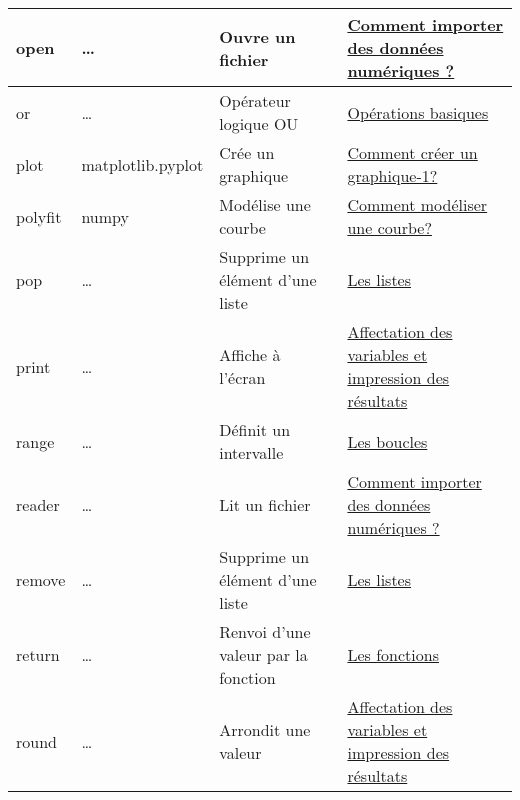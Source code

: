 \begin{longtable}{@{\extracolsep{\fill}}|p{} | p{} |p{} | p{}|@{}}
open
 & 
\ldots{}
 & 
Ouvre un fichier
 & 
\href{https://pyspc.readthedocs.io/fr/latest/05-bases/09-fichiers-csv.html}{Comment
importer des données numériques ?}
\\ \hline

or
 & 
\ldots{}
 & 
Opérateur logique OU
 & 
\href{https://pyspc.readthedocs.io/fr/latest/05-bases/04-operations_basiques.html}{Opérations
basiques}
\\ \hline

plot
 & 
matplotlib.pyplot
 & 
Crée un graphique
 & 
\href{https://pyspc.readthedocs.io/fr/latest/05-bases/10-graphiques_partie_1.html}{Comment
créer un graphique-1?}
\\ \hline

polyfit
 & 
numpy
 & 
Modélise une courbe
 & 
\href{https://pyspc.readthedocs.io/fr/latest/05-bases/11-modelisation.html}{Comment
modéliser une courbe?}
\\ \hline

pop
 & 
\ldots{}
 & 
Supprime un élément d'une liste
 & 
\href{https://pyspc.readthedocs.io/fr/latest/05-bases/08-listes.html}{Les
listes}
\\ \hline

print
 & 
\ldots{}
 & 
Affiche à l'écran
 & 
\href{https://pyspc.readthedocs.io/fr/latest/05-bases/02-variables_input_print.html}{Affectation
des variables et impression des résultats}
\\ \hline

range
 & 
\ldots{}
 & 
Définit un intervalle
 & 
\href{https://pyspc.readthedocs.io/fr/latest/05-bases/06-boucles.html}{Les
boucles}
\\ \hline

reader
 & 
\ldots{}
 & 
Lit un fichier
 & 
\href{https://pyspc.readthedocs.io/fr/latest/05-bases/09-fichiers-csv.html}{Comment
importer des données numériques ?}
\\ \hline

remove
 & 
\ldots{}
 & 
Supprime un élément d'une liste
 & 
\href{https://pyspc.readthedocs.io/fr/latest/05-bases/08-listes.html}{Les
listes}
\\ \hline

return
 & 
\ldots{}
 & 
Renvoi d'une valeur par la fonction
 & 
\href{https://pyspc.readthedocs.io/fr/latest/05-bases/05-bases/07-fonctions.html}{Les
fonctions}
\\ \hline

round
 & 
\ldots{}
 & 
Arrondit une valeur
 & 
\href{https://pyspc.readthedocs.io/fr/latest/05-bases/02-variables_input_print.html}{Affectation
des variables et impression des résultats}
\\ \hline


\end{longtable}

